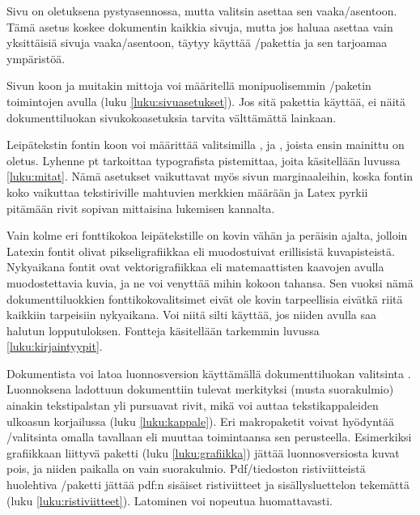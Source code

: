 Sivu on oletuksena pysty\-asen\-nossa, mutta valitsin 
 asettaa sen vaaka\-/asentoon. Tämä asetus koskee
dokumentin kaikkia sivuja, mutta jos haluaa asettaa vain yksittäisiä
sivuja vaaka\-/asentoon, täytyy käyttää
\-/pakettia ja sen tarjoamaa
ympäristöä.

Sivun koon ja muitakin mittoja voi määritellä monipuolisemmin
\-/paketin toimintojen avulla (luku
\ref{luku:sivuasetukset}). Jos sitä pakettia käyttää, ei näitä
dokumenttiluokan sivu\-koko\-ase\-tuk\-sia tarvita välttämättä lainkaan.

Leipätekstin fontin koon voi määrittää valitsimilla \koodi{10pt},
\koodimargin{10pt} \koodimargin{11pt} \koodimargin{12pt} \koodi{11pt} ja
\koodi{12pt}, joista ensin mainittu on oletus. Lyhenne pt tarkoittaa
typografista pistemittaa, joita käsitellään luvussa \ref{luku:mitat}.
Nämä asetukset vaikuttavat myös sivun marginaaleihin, koska fontin koko
vaikuttaa tekstiriville mahtuvien merkkien määrään ja Latex pyrkii
pitämään rivit sopivan mittaisina lukemisen kannalta.

Vain kolme eri fonttikokoa leipätekstille on kovin vähän ja peräisin
ajalta, jolloin Latexin fontit olivat pik\-seli\-gra\-fiik\-kaa eli
muodostuivat erillisistä kuvapisteistä. Nyky\-aika\-na fontit ovat
vek\-tori\-gra\-fiik\-kaa eli matemaattisten kaavojen avulla
muodostettavia kuvia, ja ne voi venyttää mihin kokoon tahansa. Sen
vuoksi nämä dokumenttiluokkien fonttikokovalitsimet eivät ole kovin
tarpeellisia eivätkä riitä kaikkiin tarpeisiin nykyaikana. Voi niitä
silti käyttää, jos niiden avulla saa halutun lopputuloksen. Fontteja
käsitellään tarkemmin luvussa \ref{luku:kirjaintyypit}.

Dokumentista voi latoa luonnosversion käyttämällä dokumenttiluokan
valitsinta .  Luonnoksena ladottuun
dokumenttiin tulevat merkityksi (musta suorakulmio) ainakin
tekstipalstan yli pursuavat rivit, mikä voi auttaa tekstikappaleiden
ulkoasun korjailussa (luku \ref{luku:kappale}). Eri makropaketit voivat
hyödyntää \-/valitsinta omalla tavallaan eli muuttaa
toimintaansa sen perusteella. Esimerkiksi grafiikkaan liittyvä paketti
 (luku \ref{luku:grafiikka}) jättää luonnosversiosta
kuvat pois, ja niiden paikalla on vain suorakulmio. Pdf\-/tiedoston
ristiviitteistä huolehtiva \-/paketti jättää pdf:n
sisäiset ristiviitteet ja sisällysluettelon tekemättä (luku
\ref{luku:ristiviitteet}). Latominen voi nopeutua huomattavasti.

